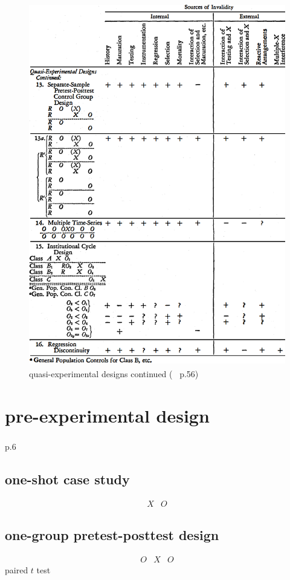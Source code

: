 \documentclass[
]{book}
\theoremstyle{definition}
\theoremstyle{definition}
\theoremstyle{definition}
\theoremstyle{definition}
\theoremstyle{remark}
\begin{document}
\begin{figure}
\includegraphics[width=0.65\linewidth]{img/quasi-experimental-designs-2} \caption{quasi-experimental designs continued (~\textsuperscript{} p.56)}\label{fig:unnamed-chunk-3}
\end{figure}

\section{pre-experimental design}\label{pre-experimental-design}

\textsuperscript{} p.6

\subsection{one-shot case study}\label{one-shot-case-study}

\[
\begin{array}{ccc}
X & O
\end{array}
\]

\subsection{one-group pretest-posttest design}\label{one-group-pretest-posttest-design}

\[
\begin{array}{ccc}
O & X & O
\end{array}
\]
paired \(t\) test
\end{document}
